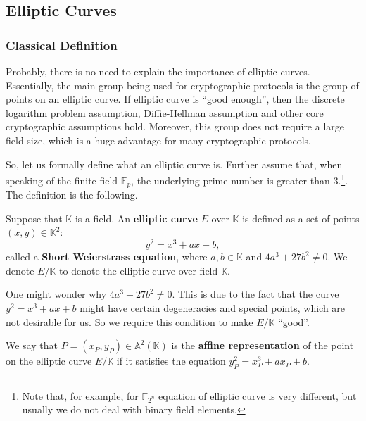 \documentclass[../lecture-notes.tex]{subfiles}
\begin{document}
\subsection{Elliptic Curves}

\subsubsection{Classical Definition}

Probably, there is no need to explain the importance of elliptic curves. Essentially, the main group being used for cryptographic 
protocols is the group of points on an elliptic curve. If elliptic curve is ``good enough'', then the discrete logarithm problem assumption,
Diffie-Hellman assumption and other core cryptographic assumptions hold. Moreover, this group does not require
a large field size, which is a huge advantage for many cryptographic protocols.

So, let us formally define what an elliptic curve is. Further assume that, when speaking of the finite field $\mathbb{F}_p$, the underlying prime number is greater than $3$.\footnote{Note that, for example, for $\mathbb{F}_{2^n}$ equation of elliptic curve is very different, but usually we do not deal with binary field elements.}. The definition is the following.

\begin{definition}
    Suppose that $\mathbb{K}$ is a field. An \textbf{elliptic curve} $E$ over $\mathbb{K}$ is defined as a set of points $(x,y) \in \mathbb{K}^2$:
    \begin{equation*}
        y^2 = x^3+ax+b,
    \end{equation*}
    called a \textbf{Short Weierstrass equation}, where $a,b \in \mathbb{K}$ and $4a^3+27b^2 \neq 0$. We denote $E/\mathbb{K}$ to denote the elliptic curve over field $\mathbb{K}$.
\end{definition}

\begin{remark}
    One might wonder why $4a^3+27b^2 \neq 0$. This is due to the fact that the curve $y^2=x^3+ax+b$ might have certain degeneracies and special points, which are not desirable for us. So we require this condition to make $E/\mathbb{K}$ ``good''.
\end{remark}

\begin{definition}
    We say that $P=(x_P,y_P) \in \mathbb{A}^2(\mathbb{K})$ is the \textbf{affine representation} of the point on the elliptic curve $E/\mathbb{K}$ if it satisfies the equation $y_P^2=x_P^3+ax_P+b$.
\end{definition}
\end{document}
